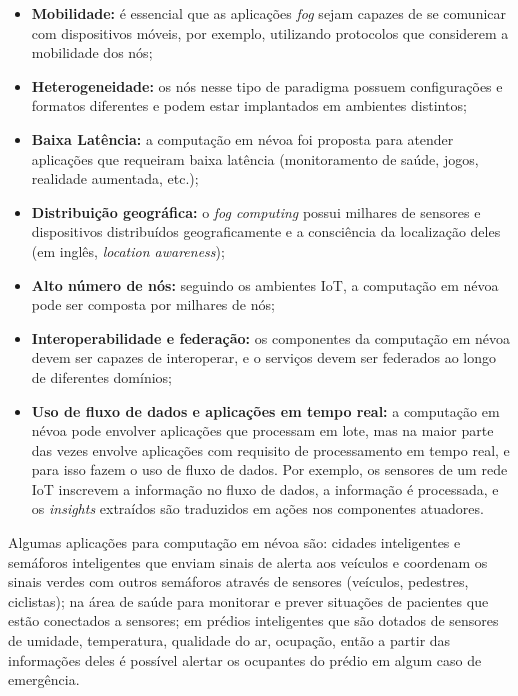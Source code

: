 \begin{itemize}

    \item \textbf{Mobilidade:} é essencial que as aplicações \emph{fog} sejam
    capazes de se comunicar com dispositivos móveis, por exemplo, utilizando
    protocolos que considerem a mobilidade dos nós;

    \item \textbf{Heterogeneidade:} os nós nesse tipo de paradigma possuem
    configurações e formatos diferentes e podem estar implantados em ambientes
    distintos;

    \item \textbf{Baixa Latência:} a computação em névoa foi proposta para
    atender aplicações que requeiram baixa latência (monitoramento de saúde,
    jogos, realidade aumentada, etc.);

    \item \textbf{Distribuição geográfica:} o \emph{fog computing} possui
    milhares de sensores e dispositivos distribuídos geograficamente e a
    consciência da localização deles (em inglês, \emph{location awareness});

    \item \textbf{Alto número de nós:} seguindo os ambientes IoT, a computação
    em névoa pode ser composta por milhares de nós;

    \item \textbf{Interoperabilidade e federação:} os componentes da computação
    em névoa devem ser capazes de interoperar, e o serviços devem ser federados
    ao longo de diferentes domínios;

    \item \textbf{Uso de fluxo de dados e aplicações em tempo real:} a
    computação em névoa pode envolver aplicações que processam em lote, mas na
    maior parte das vezes envolve aplicações com requisito de processamento em
    tempo real, e para isso fazem o uso de fluxo de dados. Por exemplo, os
    sensores de um rede IoT inscrevem a informação no fluxo de dados, a
    informação é processada, e os \emph{insights} extraídos são traduzidos em
    ações nos componentes atuadores.

\end{itemize}

Algumas aplicações para computação em névoa são: cidades inteligentes e
semáforos inteligentes que enviam sinais de alerta aos veículos e coordenam os
sinais verdes com outros semáforos através de sensores (veículos, pedestres,
ciclistas); na área de saúde para monitorar e prever situações de pacientes que
estão conectados a sensores; em prédios inteligentes que são dotados de sensores
de umidade, temperatura, qualidade do ar, ocupação, então a partir das
informações deles é possível alertar os ocupantes do prédio em algum caso de
emergência.


